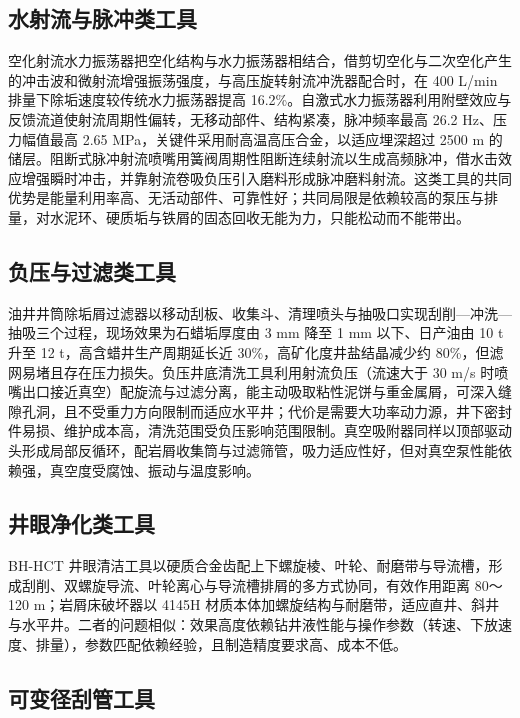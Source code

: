 \subsection{水射流与脉冲类工具}

空化射流水力振荡器把空化结构与水力振荡器相结合，借剪切空化与二次空化产生的冲击波和微射流增强振荡强度，与高压旋转射流冲洗器配合时，在 400 L/min 排量下除垢速度较传统水力振荡器提高 16.2\%。自激式水力振荡器利用附壁效应与反馈流道使射流周期性偏转，无移动部件、结构紧凑，脉冲频率最高 26.2 Hz、压力幅值最高 2.65 MPa，关键件采用耐高温高压合金，以适应埋深超过 2500 m 的储层。阻断式脉冲射流喷嘴用簧阀周期性阻断连续射流以生成高频脉冲，借水击效应增强瞬时冲击，并靠射流卷吸负压引入磨料形成脉冲磨料射流。这类工具的共同优势是能量利用率高、无活动部件、可靠性好；共同局限是依赖较高的泵压与排量，对水泥环、硬质垢与铁屑的固态回收无能为力，只能松动而不能带出。

\subsection{负压与过滤类工具}

油井井筒除垢屑过滤器以移动刮板、收集斗、清理喷头与抽吸口实现刮削—冲洗—抽吸三个过程，现场效果为石蜡垢厚度由 3 mm 降至 1 mm 以下、日产油由 10 t 升至 12 t，高含蜡井生产周期延长近 30\%，高矿化度井盐结晶减少约 80\%，但滤网易堵且存在压力损失。负压井底清洗工具利用射流负压（流速大于 30 m/s 时喷嘴出口接近真空）配旋流与过滤分离，能主动吸取粘性泥饼与重金属屑，可深入缝隙孔洞，且不受重力方向限制而适应水平井；代价是需要大功率动力源，井下密封件易损、维护成本高，清洗范围受负压影响范围限制。真空吸附器同样以顶部驱动头形成局部反循环，配岩屑收集筒与过滤筛管，吸力适应性好，但对真空泵性能依赖强，真空度受腐蚀、振动与温度影响。

\subsection{井眼净化类工具}

BH-HCT 井眼清洁工具以硬质合金齿配上下螺旋棱、叶轮、耐磨带与导流槽，形成刮削、双螺旋导流、叶轮离心与导流槽排屑的多方式协同，有效作用距离 80～120 m；岩屑床破坏器以 4145H 材质本体加螺旋结构与耐磨带，适应直井、斜井与水平井。二者的问题相似：效果高度依赖钻井液性能与操作参数（转速、下放速度、排量），参数匹配依赖经验，且制造精度要求高、成本不低。

\subsection{可变径刮管工具}

